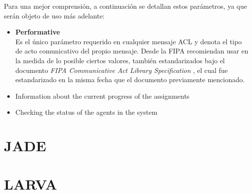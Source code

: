 Para una mejor comprensión, a continuación se detallan estos parámetros, ya que serán objeto de uso más adelante:\\

\begin{itemize}
	\item \textbf{Performative}\\
	Es el único parámetro requerido en cualquier mensaje ACL y denota el tipo de acto comunicativo del propio mensaje. Desde la FIPA recomiendan usar en la medida de lo posible ciertos valores, también estandarizados bajo el documento \textit{FIPA Communicative Act Library Specification} \cite{unknown-author-2002B}, el cual fue estandarizado en la misma fecha que el documento previamente mencionado.
	\item Information about the current progress of the assignments
	\item Checking the status of the agents in the system
\end{itemize}

\section{JADE}

\section{LARVA}
